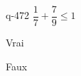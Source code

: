 \begin{truefalse}{q-472}
$\dfrac{1}{7} + \dfrac{7}{9} \leq 1$
\item* Vrai
\item Faux
\end{truefalse}

